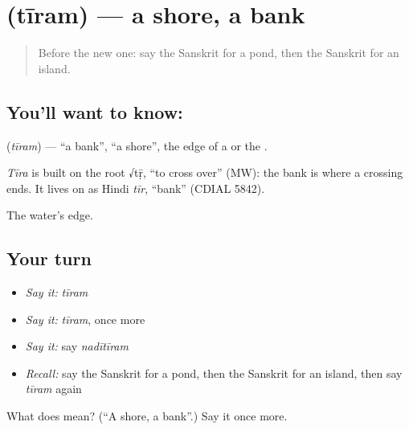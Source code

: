 \section[\texorpdfstring{\sk{तीरम्} (tīram)}{तीरम् (tīram)}]{ (tīram) — a shore, a bank}

\label{lesson:SA-C82-shore}



\begin{quote}
Before the new one: say the Sanskrit for a pond, then the Sanskrit for an island.
\end{quote}

\subsection*{You'll want to know: }
\textbf{} (\emph{tīram}) — \textquotedblleft{}a bank\textquotedblright{}, \textquotedblleft{}a shore\textquotedblright{}, the edge of a \textbf{} or the \textbf{}.

\begin{cousinweb}
\emph{Tīra} is built on the root √tṝ, \textquotedblleft{}to cross over\textquotedblright{} (MW): the bank is where a crossing ends. It lives on as Hindi \emph{tīr}, \textquotedblleft{}bank\textquotedblright{} (CDIAL 5842).
\end{cousinweb}

\begin{grammarlens}[title={What you've built}]
The water's edge.
\end{grammarlens}

\subsection*{Your turn}
\begin{itemize}
\raggedright
  \item \emph{Say it:} \emph{tīram}
  \item \emph{Say it:} \emph{tīram}, once more
  \item \emph{Say it:} say \emph{nadītīram}
  \item \emph{Recall:} say the Sanskrit for a pond, then the Sanskrit for an island, then say \emph{tīram} again
\end{itemize}

\begin{tcolorbox}[breakable,colback=teal!4,colframe=teal!35!black,title={Before you move on}]
What does  mean? (\textquotedblleft{}A shore, a bank\textquotedblright{}.) Say it once more.
\end{tcolorbox}
